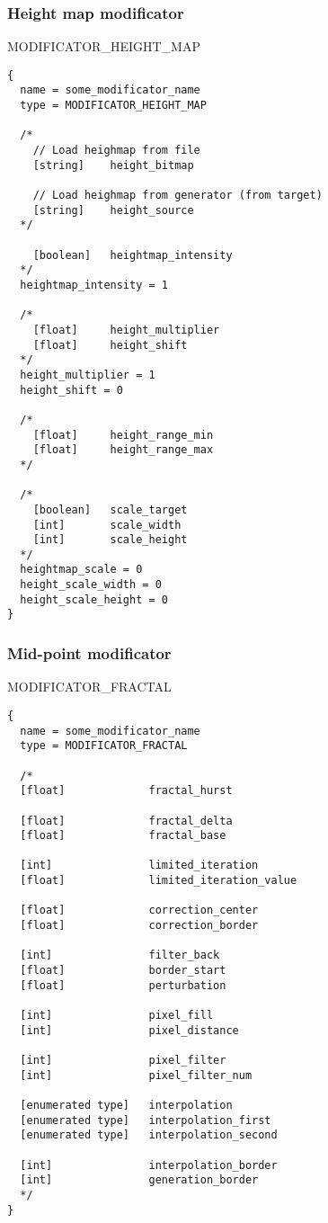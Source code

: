 \documentclass[11pt]{article}
\begin{document}
\subsubsection{Height map modificator}
MODIFICATOR\_HEIGHT\_MAP

\begin{verbatim}
{
  name = some_modificator_name
  type = MODIFICATOR_HEIGHT_MAP
  
  /*
    // Load heighmap from file
    [string]    height_bitmap
    
    // Load heighmap from generator (from target)
    [string]    height_source
  */
  
    [boolean]   heightmap_intensity
  */
  heightmap_intensity = 1
  
  /*    
    [float]     height_multiplier
    [float]     height_shift
  */
  height_multiplier = 1
  height_shift = 0
  
  /*
    [float]     height_range_min
    [float]     height_range_max
  */
  
  /*  
    [boolean]   scale_target
    [int]       scale_width
    [int]       scale_height
  */
  heightmap_scale = 0
  height_scale_width = 0
  height_scale_height = 0
}
\end{verbatim}

\subsubsection{Mid-point modificator}

MODIFICATOR\_FRACTAL

\begin{verbatim}
{
  name = some_modificator_name
  type = MODIFICATOR_FRACTAL

  /*
  [float]             fractal_hurst

  [float]             fractal_delta
  [float]             fractal_base
  
  [int]               limited_iteration
  [float]             limited_iteration_value
  
  [float]             correction_center
  [float]             correction_border
  
  [int]               filter_back
  [float]             border_start
  [float]             perturbation
  
  [int]               pixel_fill
  [int]               pixel_distance
  
  [int]               pixel_filter
  [int]               pixel_filter_num

  [enumerated type]   interpolation
  [enumerated type]   interpolation_first
  [enumerated type]   interpolation_second
  
  [int]               interpolation_border      
  [int]               generation_border
  */  
}
\end{verbatim}
\end{document}
